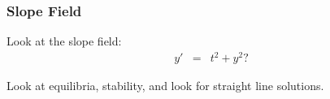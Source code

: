 \begin{frame}
  \frametitle{Slope Field}

  Look at the slope field:
  \begin{eqnarray*}
    y' & = & t^2 + y^2?
  \end{eqnarray*}


  Look at equilibria, stability, and look for straight line solutions.

\end{frame}


